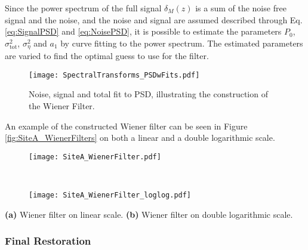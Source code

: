 \documentclass[../../CompleteThesis2/Complete_2ndDraft]{subfiles}
\begin{document}
Since the power spectrum of the full signal $\delta_M(z)$ is a sum of the noise free signal and the noise, and the noise and signal are assumed described through Eq. \ref{eq:SignalPSD} and \ref{eq:NoisePSD}, it is possible to estimate the parameters $P_0$, $\sigma_{\text{tot}}^2$, $\sigma_{\eta}^2$ and $a_1$ by curve fitting to the power spectrum. The estimated parameters are varied to find the optimal guess to use for the filter.
\begin{figure}
	\centering
	\texttt{[image: SpectralTransforms\_PSDwFits.pdf]}
	\caption[FFT, DCT, NDCT PSDs with Fit, Site A]{\small Noise, signal and total fit to PSD, illustrating the construction of the Wiener Filter.}
	\label{fig:SpectralTransforms_PSDwFits}
\end{figure}
An example of the constructed Wiener filter can be seen in Figure \ref{fig:SiteA_WienerFilters} on both a linear and a double logarithmic scale.


\begin{marginfigure}
	\centering
	\begin{subfigure}{\marginparwidth}
		\centering
		\texttt{[image: SiteA\_WienerFilter.pdf]}
		\caption{\footnotesize}
		\label{fig:SiteA_WienerFilter}
	\end{subfigure}\\[1ex]
	
	\begin{subfigure}{\marginparwidth}
		\centering
		\texttt{[image: SiteA\_WienerFilter\_loglog.pdf]}
		\caption{\footnotesize}
		\label{fig:SiteA_WienerFilter_loglog}
	\end{subfigure}
	\caption[Wiener filter]{\footnotesize\textbf{(a)} Wiener filter on linear scale. \textbf{(b)} Wiener filter on double logarithmic scale.}
	\label{fig:SiteA_WienerFilters}
\end{marginfigure}

\subsubsection[Final Restoration][Final Restoration]{Final Restoration}
\label{Subsubsec:SignalAnalysis_BackDiffusion_FinalRestoration}
\end{document}
